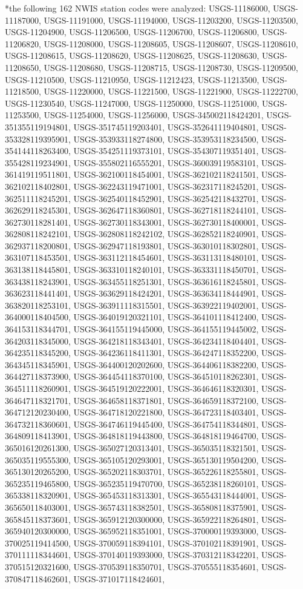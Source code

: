 \begin{changemargin}{0.5cm}{2.5cm} 
*the following 162 NWIS station codes were analyzed: USGS-11186000, USGS-11187000, USGS-11191000, USGS-11194000, USGS-11203200, USGS-11203500, USGS-11204900, USGS-11206500, USGS-11206700, USGS-11206800, USGS-11206820, USGS-11208000, USGS-11208605, USGS-11208607, USGS-11208610, USGS-11208615, USGS-11208620, USGS-11208625, USGS-11208630, USGS-11208650, USGS-11208680, USGS-11208715, USGS-11208730, USGS-11209500, USGS-11210500, USGS-11210950, USGS-11212423, USGS-11213500, USGS-11218500, USGS-11220000, USGS-11221500, USGS-11221900, USGS-11222700, USGS-11230540, USGS-11247000, USGS-11250000, USGS-11251000, USGS-11253500, USGS-11254000, USGS-11256000, USGS-345002118424201, USGS-351355119194801, USGS-351745119203401, USGS-352641119404801, USGS-353328119395901, USGS-353933118274800, USGS-353953118234500, USGS-354144118263400, USGS-354251119373101, USGS-354307119351401, USGS-355428119234901, USGS-355802116555201, USGS-360039119583101, USGS-361419119511801, USGS-362100118454001, USGS-362102118241501, USGS-362102118402801, USGS-362243119471001, USGS-362317118245201, USGS-362511118245201, USGS-362540118452901, USGS-362542118432701, USGS-362629118245301, USGS-362647118360801, USGS-362718118244101, USGS-362730118281401, USGS-362730118343001, USGS-362730118400001, USGS-362808118242101, USGS-362808118242102, USGS-362852118240901, USGS-362937118200801, USGS-362947118193801, USGS-363010118302801, USGS-363107118453501, USGS-363112118454601, USGS-363113118480101, USGS-363138118445801, USGS-363310118240101, USGS-363331118450701, USGS-363438118243901, USGS-363455118251301, USGS-363616118245801, USGS-363623118441401, USGS-363629118424201, USGS-363634118444901, USGS-363820118253101, USGS-363911118315501, USGS-363922119402001, USGS-364000118404500, USGS-364019120321101, USGS-364101118412400, USGS-364153118344701, USGS-364155119445000, USGS-364155119445002, USGS-364203118345000, USGS-364218118343401, USGS-364234118404401, USGS-364235118345200, USGS-364236118411301, USGS-364247118352200, USGS-364345118345901, USGS-364400120202600, USGS-364406118382200, USGS-364427118373900, USGS-364454118370100, USGS-364510118262301, USGS-364511118260901, USGS-364519120222001, USGS-364646118320301, USGS-364647118321701, USGS-364658118371801, USGS-364659118372100, USGS-364712120230400, USGS-364718120221800, USGS-364723118403401, USGS-364732118360601, USGS-364746119445400, USGS-364754118344801, USGS-364809118413901, USGS-364818119443800, USGS-364818119464700, USGS-365016120261300, USGS-365027120313401, USGS-365035118321501, USGS-365035119555300, USGS-365105120293001, USGS-365130119504200, USGS-365130120265200, USGS-365202118303701, USGS-365226118255801, USGS-365235119465800, USGS-365235119470700, USGS-365238118260101, USGS-365338118320901, USGS-365453118313301, USGS-365543118444001, USGS-365650118403001, USGS-365743118382501, USGS-365808118375901, USGS-365845118373601, USGS-365912120300000, USGS-365922118264801, USGS-365940120300000, USGS-365952118351001, USGS-370000119393000, USGS-370025119414500, USGS-370059118394101, USGS-370102118391901, USGS-370111118344601, USGS-370140119393000, USGS-370312118342201, USGS-370515120321600, USGS-370539118350701, USGS-370555118354601, USGS-370847118462601, USGS-371017118424601, 
\end{changemargin}
